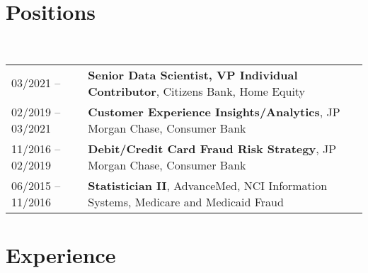 \documentclass[a4paper,11pt]{article}
\begin{document}
\maketitle

\section{Positions}

~\begin{tabular}{lP{15cm}}
03/2021 --& \textbf{Senior Data Scientist, VP Individual Contributor},
        Citizens Bank, Home Equity\\
02/2019 -- 03/2021 & \textbf{Customer Experience Insights/Analytics},
        JP Morgan Chase, Consumer Bank \\
11/2016 -- 02/2019& \textbf{Debit/Credit Card Fraud Risk Strategy},
        JP Morgan Chase, Consumer Bank \\
06/2015 -- 11/2016 & \textbf{Statistician II}, 
        AdvanceMed, NCI Information Systems, Medicare and Medicaid Fraud \\
  \end{tabular}

\section{Experience}
\end{document}

